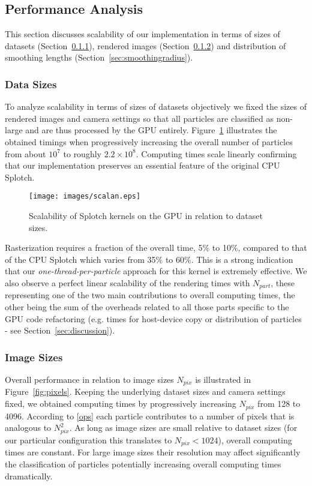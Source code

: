 \documentclass[1p]{elsarticle}
\begin{document}
\subsection{Performance Analysis}
\label{sec:performance}
This section discusses scalability of our implementation in terms of sizes of datasets (Section~\ref{sec:datasizes}), rendered images (Section~\ref{sec:imagesizes}) and distribution of smoothing lengths (Section~\ref{sec:smoothingradius}).

\subsubsection{Data Sizes}
\label{sec:datasizes}
To analyze scalability in terms of sizes of datasets objectively we fixed the sizes of rendered images and camera settings so that all particles are classified as non-large and are thus processed by the GPU entirely. Figure~\ref{fig:scalability} illustrates the obtained timings when progressively increasing the overall number of particles
from about $10^7$ to roughly $2.2\times 10^8$. Computing times scale linearly confirming that our implementation preserves an essential feature of the original CPU Splotch. 
\begin{figure}
\centering
\texttt{[image: images/scalan.eps]}
\caption{Scalability of Splotch kernels on the GPU in relation to dataset sizes.}
\label{fig:scalability}
\end{figure}
Rasterization requires a fraction of the overall time, 5\% to 10\%, compared to that of the CPU Splotch which varies from 35\% to 60\%. This is a strong indication that our {\it one-thread-per-particle} approach for this kernel is extremely effective. We also observe a perfect linear scalability of the rendering times with $N_{part}$, these representing one of the two main contributions to overall computing times, the other being the sum of the overheads related to all those parts specific to the GPU code refactoring (e.g. times for host-device copy or distribution of particles - see Section~\ref{sec:discussion}). 
\subsubsection{Image Sizes}
\label{sec:imagesizes}
Overall performance in relation to image sizes $N_{pix}$ is illustrated in Figure~\ref{fig:pixels}. Keeping the underlying dataset sizes and camera settings fixed, we obtained computing times by progressively increasing
$N_{pix}$ from 128 to 4096. According to \eqref{ops} each particle contributes to a number of pixels 
that is analogous to $N_{pix}^{2}$. As long as image sizes are small relative to dataset sizes (for our particular configuration this translates to $N_{pix} < 1024$), overall computing times are constant. For large image sizes their resolution may affect significantly the classification of particles potentially increasing overall computing times dramatically.
\end{document}
